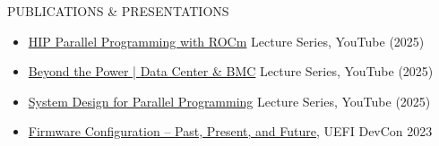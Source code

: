 \documentclass{resume} %
\begin{document}
\begin{rSection}{PUBLICATIONS \& PRESENTATIONS}

\begin{itemize}
    \item \href{https://youtube.com/playlist?list=PLWyBQeJgIuzDFELUK9ineNkOr9LuYatkR&si=mUVeIkLFK5gzyZa7}{HIP Parallel Programming with ROCm} Lecture Series, YouTube (2025)
    \item \href{https://youtube.com/playlist?list=PLWyBQeJgIuzC6oN8AihmSMkgheX9TLDaW&si=HAOmHXKP4KdsAzPX}{Beyond the Power | Data Center \& BMC} Lecture Series, YouTube (2025)
    \item \href{https://www.youtube.com/playlist?list=PLWyBQeJgIuzD2o9ZVw5oI-P2fX4uyNKZA}{System Design for Parallel Programming} Lecture Series, YouTube (2025)
    \item \href{https://uefi.org/sites/default/files/resources/Firmware%20Configuration%20%E2%80%93%20Past%2C%20Present%2C%20and%20Future_Zimmer.pdf}{Firmware Configuration – Past, Present, and Future}, UEFI DevCon 2023
\end{itemize}

\end{rSection}
\end{document}
